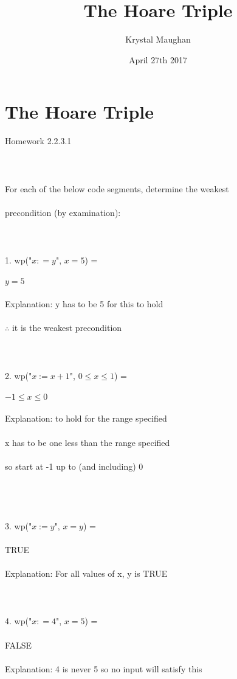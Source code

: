 \documentclass{article}
\title{The Hoare Triple}
\author{Krystal Maughan }
\date{April 27th 2017}
\begin{document}
\maketitle

\section{The Hoare Triple}
Homework 2.2.3.1
\\
\\
\\
\\
For each of the below code segments, determine the weakest 
\\
\\
precondition (by examination):
\\
\\
\\
\\
1. wp("$x : = y$", $x = 5$) = 
\\
\\
$ y = 5$
\\
\\
Explanation: y has to be 5 for this to hold 
\\
\\
$\therefore $  it is the weakest precondition
\\
\\
\\
\\
2. wp("$x:=x + 1$", $0 \leq x \leq 1$) = 
\\
\\
$-1 \leq x \leq 0$
\\
\\
Explanation: to hold for the range specified
\\
\\
x has to be one less than the range specified
\\
\\
so start at -1 up to (and including) 0
\\
\\
\\
\\
\\
3. wp("$x:=y$", $x = y$) =
\\
\\
TRUE
\\
\\
Explanation: For all values of x, y is TRUE
\\
\\
\\
\\
4. wp("$x: = 4$", $x = 5$) = 
\\
\\
FALSE
\\
\\
Explanation: 4 is never 5 so no input will satisfy this
\end{document}
